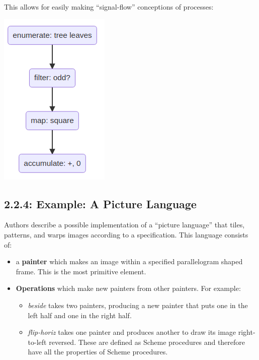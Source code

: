 \documentclass[final,fleqn,titlepage]{article}
\begin{document}
This allows for easily making ``signal-flow'' conceptions of processes:

\begin{center}
\includegraphics[width=.9\linewidth]{2/fig/t_2-2-3.png}
\end{center}

\subsection{2.2.4: Example: A Picture Language}
\label{sec:org1ca97b6}
Authors describe a possible implementation of a ``picture language'' that tiles,
patterns, and warps images according to a specification. This language consists
of:

\begin{itemize}
\item a \textbf{painter} which makes an image within a specified parallelogram shaped
frame. This is the most primitive element.
\item \textbf{Operations} which make new painters from other painters. For example:
\begin{itemize}
\item \emph{beside} takes two painters, producing a new painter that puts one in the
left half and one in the right half.
\item \emph{flip-horiz} takes one painter and produces another to draw its image
right-to-left reversed. These are defined as Scheme procedures and therefore
have all the properties of Scheme procedures.
\end{itemize}
\end{itemize}
\end{document}
